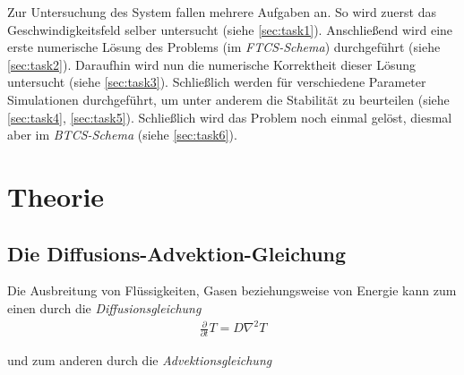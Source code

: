 \documentclass[12pt,a4paper,titlepage,headinclude,bibtotoc]{scrartcl}
\begin{document}
Zur Untersuchung des System fallen mehrere Aufgaben an. So wird zuerst das Geschwindigkeitsfeld selber untersucht (siehe \ref{sec:task1}). Anschließend wird eine erste numerische Lösung des Problems (im \textit{FTCS-Schema}) durchgeführt (siehe \ref{sec:task2}). Daraufhin wird nun die numerische Korrektheit dieser Lösung untersucht (siehe \ref{sec:task3}). Schließlich werden für verschiedene Parameter Simulationen durchgeführt, um unter anderem die Stabilität zu beurteilen (siehe \ref{sec:task4}, \ref{sec:task5}). Schließlich wird das Problem noch einmal gelöst, diesmal aber im \textit{BTCS-Schema} (siehe \ref{sec:task6}).

\section{Theorie}
\label{sec:theorie}
\subsection{Die Diffusions-Advektion-Gleichung}
\label{sec:diff_adv}
Die Ausbreitung von Flüssigkeiten, Gasen beziehungsweise von Energie kann zum einen durch die \textit{Diffusionsgleichung}
\begin{align}
\label{eq:diff}
\frac{\partial}{\partial t}T = D \nabla^2 T 
\end{align}


und zum anderen durch die \textit{Advektionsgleichung}
\end{document}
